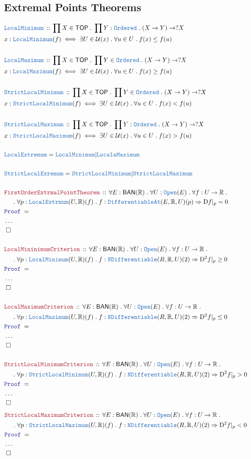 \documentclass[12pt]{scrartcl}
\newcommand{\TYPE}[1]{\textcolor{NavyBlue}{\mathtt{#1}}}
\newcommand{\LOGIC}[1]{\textcolor{Blue}{\mathtt{#1}}}
\newcommand{\THM}[1]{\textcolor{Maroon}{\mathtt{#1}}}
\renewcommand{\.}{\; . \;}
\newcommand{\Theorem}[2]{& \THM{#1} \, :: \, #2 \\ & \Proof = \\ }
\newcommand{\DeclareType}[2]{& \TYPE{#1} \, :: \, #2 \\}
\newcommand{\NewLine}{\\ & \kern 1pc}
\newcommand{\Page}[1]{\begin{align*} #1 \end{align*}   }
\newcommand{\NoProof}{ & \ldots \\ \EndProof}
\newcommand{\Reals}{\mathbb{R} }
\newcommand{\QED}{\; \square}
\newcommand{\EndProof}{& \QED \\}
\newcommand{\Proof}{\LOGIC{Proof} \; }
\newcommand{\TOP}{\mathsf{TOP}}
\newcommand{\BAN}{\mathsf{BAN}} %
\newcommand{\D}{\mathrm{D}}
\begin{document}
\subsection{Extremal Points Theorems}
\Page{
	\DeclareType{LocalMinimum}{ \prod X \in \TOP \. \prod Y : \TYPE{Ordered} \. (X \to Y) \to ?X   }
	& x : \TYPE{LocalMinimum}(f) \iff \exists U \in \mathcal{U}(x) \. \forall u \in U \. f(x) \le f(u) \\
	\\
	\DeclareType{LocalMaximum}{ \prod X \in \TOP \. \prod Y \in \TYPE{Ordered} \. (X \to Y) \to ?X   }
	& x : \TYPE{LocalMaximum}(f) \iff \exists U \in \mathcal{U}(x) \. \forall u \in U \. f(x) \ge f(u) \\
	\\
	\DeclareType{StrictLocalMinimum}{ \prod X \in \TOP \. \prod Y \in \TYPE{Ordered} \. (X \to Y) \to ?X   }
	& x : \TYPE{StrictLocalMinimum}(f) \iff \exists U \in \mathcal{U}(x) \. \forall u \in U \. f(x) < f(u) \\
	\\
	\DeclareType{StrictLocalMaximum}{ \prod X \in \TOP \. \prod Y : \TYPE{Ordered} \. (X \to Y) \to ?X   }
	& x : \TYPE{StrictLocalMaximum}(f) \iff \exists U \in \mathcal{U}(x) \. \forall u \in U \. f(x) > f(u) \\
	\\
	&\TYPE{LocalExtremum} = \TYPE{LocalMinimum} | \TYPE{LocalaMaximum} \\
	\\
	&\TYPE{StrictLocalExremum} = \TYPE{StrictLocalMinimum} | \TYPE{StrictLocalMaximum} \\
	\\
	\Theorem{FirstOrderExtrmalPointTheorem}{ \forall E : \BAN(\Reals) \. \forall U : \TYPE{Open}(E) \.  \forall f : U \to \Reals \.
		\NewLine
		\. \forall p : \TYPE{LocalExtrmum}(U,\Reals)(f) \. 
		f : \TYPE{DifferentiableAt}(E,\Reals,U)(p) \Rightarrow \D f |_p = 0
	}
	\NoProof
	\\
	\Theorem{LocalMininimumCriterion}{   
		\forall E : \BAN(\Reals) \. \forall U : \TYPE{Open}(E) \. \forall f : U \to \Reals \.
		\NewLine
		\.
		\forall p : \TYPE{LocalMinimum}(U,\Reals)(f) \.
		f : \TYPE{NDifferentiable}(R,\Reals,U)(2) \Rightarrow \D^2 f |_p \ge 0
	}
	\NoProof
	\\
	\Theorem{LocalMaximumCriterion}{   
		\forall E : \BAN(\Reals) \. \forall U : \TYPE{Open}(E) \. \forall f : U \to \Reals \.
		\NewLine
		\.
		\forall p : \TYPE{LocalMaximum}(U,\Reals)(f) \.
		f : \TYPE{NDifferentiable}(R,\Reals,U)(2) \Rightarrow \D^2 f |_p \le 0
	}
	\NoProof
	\\
	\Theorem{StrictLocalMinimumCriterion}{   
		\forall E : \BAN(\Reals) \. \forall U : \TYPE{Open}(E) \. \forall f : U \to \Reals \.
		\NewLine
		\.
		\forall p : \TYPE{StrictLocalMinimum}(U,\Reals)(f) \.
		f : \TYPE{NDifferentiable}(R,\Reals,U)(2) \Rightarrow \D^2 f |_p > 0
	}
	\NoProof
} \Page{
	\Theorem{StrictLocalMaximumCriterion}{   
		\forall E : \BAN(\Reals) \. \forall U : \TYPE{Open}(E) \. \forall f : U \to \Reals \.
		\NewLine
		\.
		\forall p : \TYPE{StrictLocalMaximum}(U,\Reals)(f) \.
		f : \TYPE{NDifferentiable}(R,\Reals,U)(2) \Rightarrow \D^2 f |_p < 0
	}
	\NoProof	
}
\end{document}
